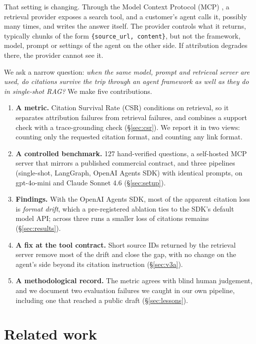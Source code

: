 \documentclass[11pt]{article}
\newcommand{\code}[1]{\texttt{#1}}
\begin{document}
That setting is changing. Through the Model Context Protocol (MCP) \citep{mcp2026spec}, a
retrieval provider exposes a search tool, and a customer's agent calls it, possibly many times,
and writes the answer itself. The provider controls what it returns, typically chunks of the form
\code{\{source\_url, content\}}, but not the framework, model, prompt or settings of the agent on the
other side. If attribution degrades there, the provider cannot see it.

We ask a narrow question: \emph{when the same model, prompt and retrieval server are used, do
citations survive the trip through an agent framework as well as they do in single-shot RAG?} We
make five contributions.

\begin{enumerate}
\item \textbf{A metric.} Citation Survival Rate (CSR) conditions on retrieval, so it separates
attribution failures from retrieval failures, and combines a support check with a trace-grounding
check (\S\ref{sec:csr}). We report it in two views: counting only the requested citation format,
and counting any link format.
\item \textbf{A controlled benchmark.} 127 hand-verified questions, a self-hosted MCP server that
mirrors a published commercial contract, and three pipelines (single-shot, LangGraph, OpenAI
Agents SDK) with identical prompts, on gpt-4o-mini and Claude Sonnet 4.6 (\S\ref{sec:setup}).
\item \textbf{Findings.} With the OpenAI Agents SDK, most of the apparent citation loss is
\emph{format drift}, which a pre-registered ablation ties to the SDK's default model API; across
three runs a smaller loss of citations remains (\S\ref{sec:results}).
\item \textbf{A fix at the tool contract.} Short source IDs returned by the retrieval server
remove most of the drift and close the gap, with no change on the agent's side beyond its
citation instruction (\S\ref{sec:v3a}).
\item \textbf{A methodological record.} The metric agrees with blind human judgement, and we
document two evaluation failures we caught in our own pipeline, including one that reached a
public draft (\S\ref{sec:lessons}).
\end{enumerate}

\section{Related work}
\end{document}
